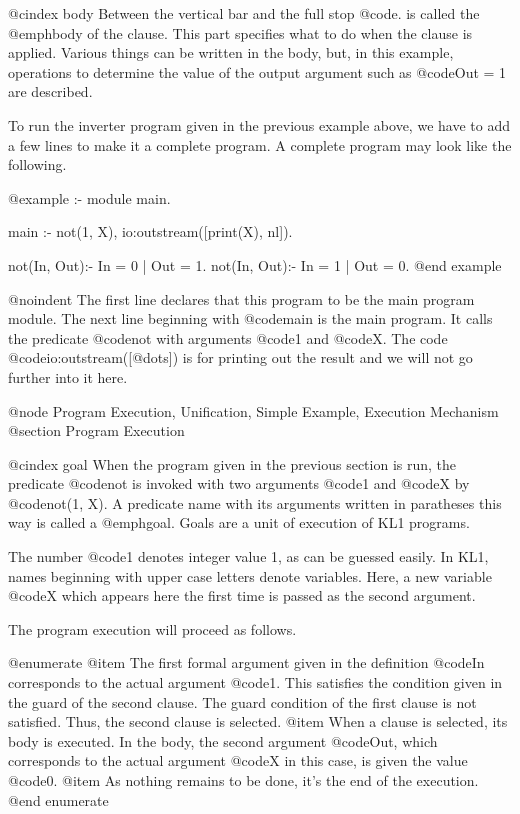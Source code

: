 @cindex body
Between the vertical bar and the full stop @code{.} is called the
@emph{body} of the clause.  This part specifies what to do when the
clause is applied.  Various things can be written in the body, but, in
this example, operations to determine the value of the output argument
such as @code{Out = 1} are described.

To run the inverter program given in the previous example above, we have
to add a few lines to make it a complete program.  A complete program
may look like the following.

@example
:- module main.

main :- not(1, X), io:outstream([print(X), nl]).

not(In, Out):- In = 0 | Out = 1.
not(In, Out):- In = 1 | Out = 0.
@end example

@noindent
The first line declares that this program to be the main program module.
The next line beginning with @code{main} is the main program.  It calls
the predicate @code{not} with arguments @code{1} and @code{X}.  The code
@code{io:outstream([@dots{}])} is for printing out the result and we
will not go further into it here.

@node Program Execution, Unification, Simple Example, Execution Mechanism
@section Program Execution

@cindex goal
When the program given in the previous section is run, the predicate
@code{not} is invoked with two arguments @code{1} and @code{X} by
@code{not(1, X)}.  A predicate name with its arguments written in
paratheses this way is called a @emph{goal}.  Goals are a unit of
execution of KL1 programs.

The number @code{1} denotes integer value 1, as can be guessed easily.
In KL1, names beginning with upper case letters denote variables.  Here,
a new variable @code{X} which appears here the first time is passed as
the second argument.

The program execution will proceed as follows.

@enumerate
@item
The first formal argument given in the definition @code{In} corresponds
to the actual argument @code{1}.  This satisfies the condition given in
the guard of the second clause.  The guard condition of the first clause
is not satisfied.  Thus, the second clause is selected.
@item
When a clause is selected, its body is executed.  In the body, the
second argument @code{Out}, which corresponds to the actual argument
@code{X} in this case, is given the value @code{0}.
@item
As nothing remains to be done, it's the end of the execution.
@end enumerate

